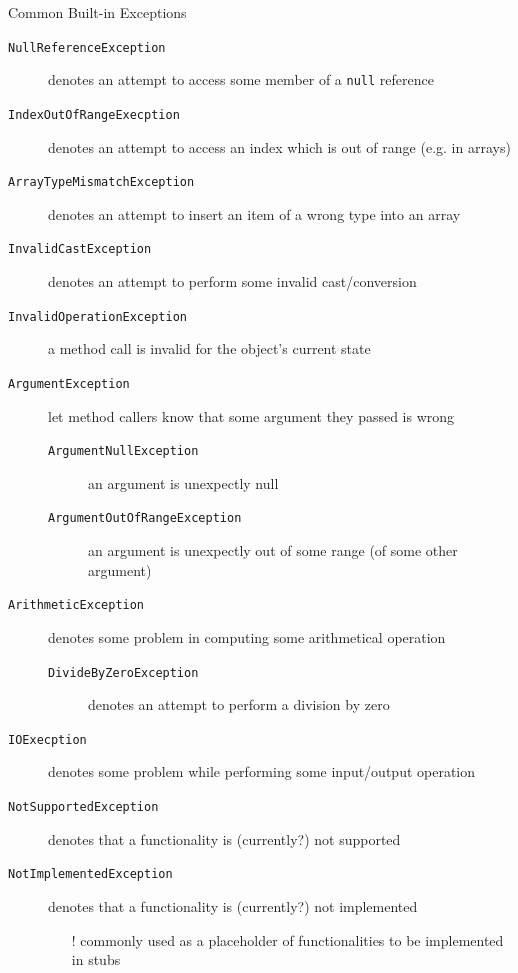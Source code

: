 \documentclass[presentation]{beamer}
\begin{document}
\begin{frame}[allowframebreaks]{Common Built-in Exceptions}
  \begin{description}
    \item[\texttt{NullReferenceException}] denotes an attempt to access some member of a \texttt{null} reference
    \smallskip 
    \item[\texttt{IndexOutOfRangeExecption}] denotes an attempt to access an index which is out of range (e.g. in arrays)
    \smallskip 
    \item[\texttt{ArrayTypeMismatchException}] denotes an attempt to insert an item of a wrong type into an array
    \smallskip 
    \item[\texttt{InvalidCastException}] denotes an attempt to perform some invalid cast/conversion
    \smallskip 
    \item[\texttt{InvalidOperationException}] a method call is invalid for the object's current state
    \smallskip 
    \item[\texttt{ArgumentException}] let method callers know that some argument they passed is wrong
    \begin{description}
      \item[\texttt{ArgumentNullException}] an argument is unexpectly null
      \item[\texttt{ArgumentOutOfRangeException}] an argument is unexpectly out of some range (of some other argument) 
    \end{description}
    \smallskip
    \item[\texttt{ArithmeticException}] denotes some problem in computing some arithmetical operation
    \begin{description}
      \item[\texttt{DivideByZeroException}] denotes an attempt to perform a division by zero
    \end{description}
    \smallskip
    \item[\texttt{IOExecption}] denotes some problem while performing some input/output operation
    \smallskip 
    \item[\texttt{NotSupportedException}] denotes that a functionality is (currently?) not supported
    \smallskip 
    \item[\texttt{NotImplementedException}] denotes that a functionality is (currently?) not implemented 
     \begin{itemize}
      \item[!] commonly used as a \alert{placeholder} of functionalities to be implemented in stubs

\end{itemize}
\end{description}
\end{frame}
\end{document}
